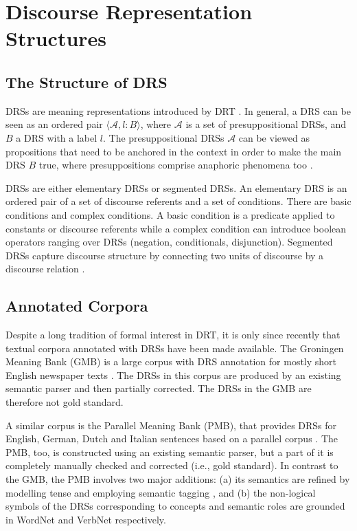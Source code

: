 \documentclass[11pt,a4paper]{article}
\begin{document}
\section{Discourse Representation Structures}
\label{sec:drs}

\subsection{The Structure of DRS}

DRSs are meaning representations introduced by DRT \cite{kampreyle:drt}.
In general, a DRS can be seen as an ordered pair $\langle \mathcal{A}, l\!:\!B \rangle$, where $\mathcal{A}$ is a set of presuppositional DRSs, and $B$ a DRS with a label $l$. The presuppositional DRSs $\mathcal{A}$ can be viewed as propositions that need to be anchored in the context in order to make the main DRS $B$ true, where presuppositions comprise anaphoric phenomena too \cite{van_der_sandt:92,geurts:pp,beaver:ppidrt}.

DRSs are either elementary DRSs or segmented DRSs. 
An elementary DRS is an ordered pair of a set of discourse referents and a set of conditions. 
There are basic conditions and complex conditions. A basic condition is a predicate applied to constants or discourse referents while a complex condition can introduce boolean operators ranging over DRSs (negation, conditionals, disjunction).  
Segmented DRSs capture discourse structure by connecting two units of discourse by a discourse relation \cite{asherlascarides}.

\subsection{Annotated Corpora}
\label{ssec:annot_corpora}

Despite a long tradition of formal interest in DRT, it is only since recently that textual corpora annotated with DRSs have been made available. The Groningen Meaning Bank (GMB) is a large corpus with DRS annotation for mostly short English newspaper texts \cite{gmb:lrec,GMB:2017}. The DRSs in this corpus are produced by an existing semantic parser and then partially corrected. The DRSs in the GMB are therefore not gold standard.

A similar corpus is the Parallel Meaning Bank (PMB), that provides DRSs for English, German, Dutch and Italian sentences based on a parallel corpus \cite{PMBshort:2017}. 
The PMB, too, is constructed using an existing semantic parser, but a part of it is completely manually checked and corrected (i.e., gold standard). 
In contrast to the GMB, the PMB involves two major additions:
(a) its semantics are refined by modelling tense and employing semantic tagging \cite{Bjervaetal:16,semantic-tagset:17}, and (b) the non-logical symbols of the DRSs corresponding to concepts and semantic roles are grounded in WordNet \cite{wordnet} and VerbNet \cite{Bonial:11} respectively.
\end{document}
